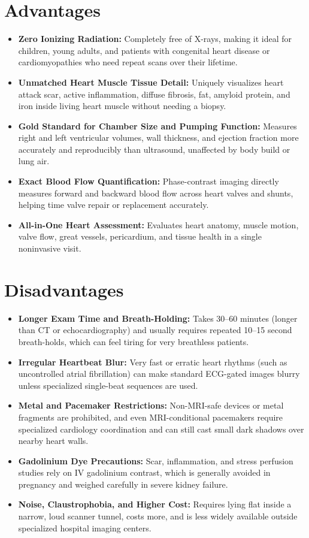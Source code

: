 \section{Advantages}
\begin{itemize}
\item \textbf{Zero Ionizing Radiation:} Completely free of X-rays, making it ideal for children, young adults, and patients with congenital heart disease or cardiomyopathies who need repeat scans over their lifetime.
\item \textbf{Unmatched Heart Muscle Tissue Detail:} Uniquely visualizes heart attack scar, active inflammation, diffuse fibrosis, fat, amyloid protein, and iron inside living heart muscle without needing a biopsy.
\item \textbf{Gold Standard for Chamber Size and Pumping Function:} Measures right and left ventricular volumes, wall thickness, and ejection fraction more accurately and reproducibly than ultrasound, unaffected by body build or lung air.
\item \textbf{Exact Blood Flow Quantification:} Phase-contrast imaging directly measures forward and backward blood flow across heart valves and shunts, helping time valve repair or replacement accurately.
\item \textbf{All-in-One Heart Assessment:} Evaluates heart anatomy, muscle motion, valve flow, great vessels, pericardium, and tissue health in a single noninvasive visit.
\end{itemize}

\section{Disadvantages}
\begin{itemize}
\item \textbf{Longer Exam Time and Breath-Holding:} Takes 30--60 minutes (longer than CT or echocardiography) and usually requires repeated 10--15 second breath-holds, which can feel tiring for very breathless patients.
\item \textbf{Irregular Heartbeat Blur:} Very fast or erratic heart rhythms (such as uncontrolled atrial fibrillation) can make standard ECG-gated images blurry unless specialized single-beat sequences are used.
\item \textbf{Metal and Pacemaker Restrictions:} Non-MRI-safe devices or metal fragments are prohibited, and even MRI-conditional pacemakers require specialized cardiology coordination and can still cast small dark shadows over nearby heart walls.
\item \textbf{Gadolinium Dye Precautions:} Scar, inflammation, and stress perfusion studies rely on IV gadolinium contrast, which is generally avoided in pregnancy and weighed carefully in severe kidney failure.
\item \textbf{Noise, Claustrophobia, and Higher Cost:} Requires lying flat inside a narrow, loud scanner tunnel, costs more, and is less widely available outside specialized hospital imaging centers.
\end{itemize}

